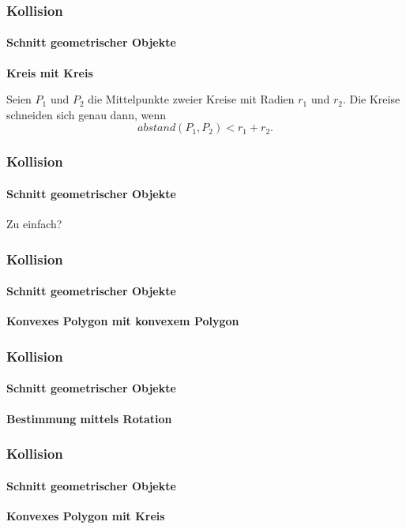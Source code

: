 \documentclass[dvips,12pt,xcolor=table]{beamer}
\begin{document}
\begin{frame}
\frametitle{Kollision}
\framesubtitle{Schnitt geometrischer Objekte}
\textbf{Kreis mit Kreis}

Seien $P_{1}$ und $P_{2}$ die Mittelpunkte zweier Kreise
mit Radien $r_{1}$ und $r_{2}$.
Die Kreise schneiden sich genau dann, wenn
\[ abstand(P_{1}, P_{2}) < r_{1} + r_{2}. \]
\end{frame}

\begin{frame}
\frametitle{Kollision}
\framesubtitle{Schnitt geometrischer Objekte}
\begin{center}
{\LARGE Zu einfach?} \\
\vspace{0.4cm}
\end{center}
\end{frame}

\begin{frame}
\frametitle{Kollision}
\framesubtitle{Schnitt geometrischer Objekte}
\textbf{Konvexes Polygon mit konvexem Polygon}

\end{frame}

\begin{frame}
\frametitle{Kollision}
\framesubtitle{Schnitt geometrischer Objekte}
\textbf{Bestimmung mittels Rotation}

\end{frame}

\begin{frame}
\frametitle{Kollision}
\framesubtitle{Schnitt geometrischer Objekte}
\textbf{Konvexes Polygon mit Kreis}

\end{frame}
\end{document}
